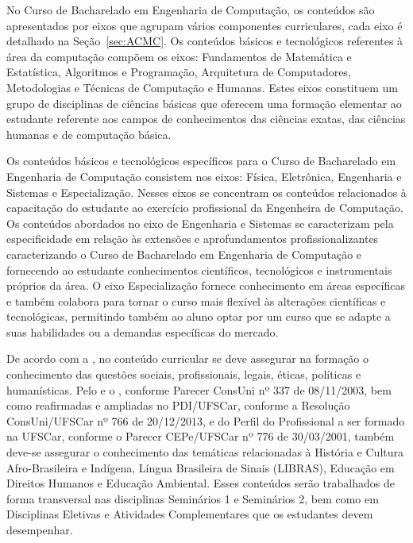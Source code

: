 No Curso de Bacharelado em Engenharia de Computação, os conteúdos são apresentados por eixos que agrupam vários componentes curriculares, cada eixo é detalhado na Seção~\ref{sec:ACMC}. Os conteúdos básicos e tecnológicos referentes à área da computação compõem os eixos: Fundamentos de Matemática e Estatística, Algoritmos e Programação, Arquitetura de Computadores, Metodologias e Técnicas de Computação e Humanas. Estes eixos constituem um grupo de disciplinas de ciências básicas que oferecem uma formação elementar ao estudante referente aos campos de conhecimentos das ciências exatas, das ciências humanas e de computação básica.

Os conteúdos básicos e tecnológicos específicos para o Curso de Bacharelado em Engenharia de Computação consistem nos eixos: Física, Eletrônica, Engenharia e Sistemas e Especialização. Nesses eixos se concentram os conteúdos relacionados à capacitação do estudante ao exercício profissional da Engenheira de Computação. Os conteúdos abordados no eixo de Engenharia e Sistemas se caracterizam pela especificidade em relação às extensões e aprofundamentos profissionalizantes caracterizando o Curso de Bacharelado em Engenharia de Computação e fornecendo ao estudante conhecimentos científicos, tecnológicos e instrumentais próprios da área. O eixo Especialização fornece conhecimento em áreas específicas e também colabora para tornar o curso mais flexível às alterações científicas e tecnológicas, permitindo também ao aluno optar por um curso que se adapte a suas habilidades ou a demandas específicas do mercado.

De acordo com a , no conteúdo curricular se deve assegurar na formação o conhecimento das questões sociais, profissionais, legais, éticas, políticas e humanísticas. Pelo  e o , conforme Parecer ConsUni nº 337 de 08/11/2003, bem como reafirmadas e ampliadas no PDI/UFSCar, conforme a Resolução ConsUni/UFSCar nº 766 de 20/12/2013, e do Perfil do Profissional a ser formado na UFSCar, conforme o Parecer CEPe/UFSCar nº 776 de 30/03/2001, também deve-se assegurar o conhecimento das temáticas relacionadas à História e Cultura Afro-Brasileira e Indígena, Língua Brasileira de Sinais (LIBRAS), Educação em Direitos Humanos e Educação Ambiental.
Esses conteúdos serão trabalhados de forma transversal nas disciplinas Seminários 1 e Seminários 2, bem como em Disciplinas Eletivas e Atividades Complementares que os estudantes devem desempenhar. %


